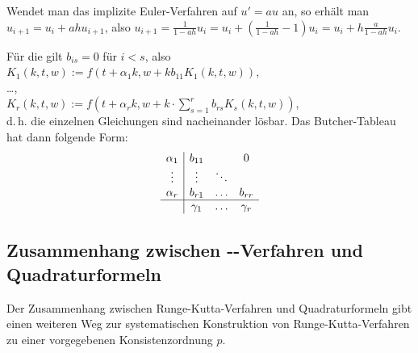 \begin{Bsp}
    Wendet man das implizite Euler-Verfahren auf $u' = au$ an,
    so erhält man\\
    $u_{i+1} = u_i + ahu_{i+1}$, also
    $u_{i+1} = \frac{1}{1 - ah} u_i =
    u_i + \left(\frac{1}{1 - ah} - 1\right) u_i =
    u_i + h \frac{a}{1 - ah} u_i$.
\end{Bsp}

\begin{Bsp}
    Für die 
    gilt $b_{is} = 0$ für $i < s$, also\\
    $K_1(k, t, w) := f(t + \alpha_1 k,
    w + k b_{11} K_1(k, t, w))$,\\
    \dots,\\
    $K_r(k, t, w) := f(t + \alpha_r k,
    w + k \cdot \sum_{s=1}^r b_{rs} K_s(k, t, w))$,\\
    d.\,h. die einzelnen Gleichungen sind nacheinander lösbar.
    Das Butcher-Tableau hat dann folgende Form:
    \begin{align*}
        \begin{array}{c|cccc}
            \alpha_1 & b_{11} & & 0\\
            \vdots & \vdots & \ddots\\
            \alpha_r & b_{r1} & \hdots & b_{rr}\\\hline
            & \gamma_1 & \hdots & \gamma_r
        \end{array}
    \end{align*}
\end{Bsp}

\pagebreak

\subsection{%
    Zusammenhang zwischen --Verfahren und
    Quadraturformeln%
}

\begin{Bem}
    Der Zusammenhang zwischen Runge-Kutta-Verfahren und Quadraturformeln
    gibt einen weiteren Weg zur systematischen Konstruktion von
    Runge-Kutta-Verfahren zu einer vorgegebenen Konsistenzordnung $p$.
\end{Bem}

